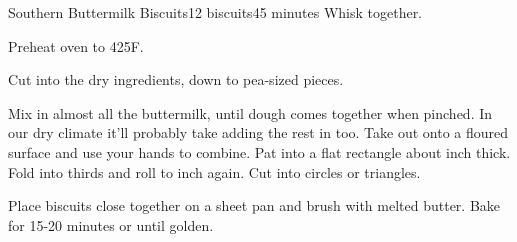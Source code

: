 \documentclass[../Cookbook.tex]{subfiles}
\begin{document}
\begin{recipe}[SouthernButtermilkBiscuits]{Southern Buttermilk Biscuits}{12 biscuits}{45 minutes}
Whisk together.

Preheat oven to 425\0F.

Cut into the dry ingredients, down to pea-sized pieces.

Mix in almost all the buttermilk, until dough comes together when pinched.
In our dry climate it'll probably take adding the rest in too.
Take out onto a floured surface and use your hands to combine.
Pat into a flat rectangle about  inch thick.
Fold into thirds and roll to  inch again.
Cut into circles or triangles.

Place biscuits close together on a sheet pan and brush with melted butter.
Bake for 15-20 minutes or until golden.

\end{recipe}
\end{document}

